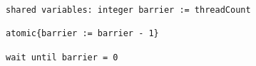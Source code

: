 \begin{lstlisting}[mathescape]
shared variables: integer barrier := threadCount

atomic{barrier := barrier - 1}

wait until barrier = 0
\end{lstlisting}
